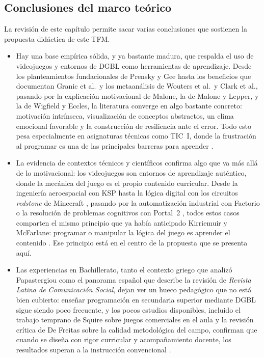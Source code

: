 \documentclass[a4paper,12pt]{article}
\begin{document}
\subsection{Conclusiones del marco teórico}

La revisión de este capítulo permite sacar varias conclusiones que sostienen la propuesta didáctica de este TFM.

\begin{itemize}
  \item Hay una base empírica sólida, y ya bastante madura, que respalda el uso de videojuegos y entornos de DGBL como herramientas de aprendizaje. Desde los planteamientos fundacionales de Prensky y Gee hasta los beneficios que documentan Granic et al.\ y los metaanálisis de Wouters et al.\ y Clark et al., pasando por la explicación motivacional de Malone, la de Malone y Lepper, y la de Wigfield y Eccles, la literatura converge en algo bastante concreto: motivación intrínseca, visualización de conceptos abstractos, un clima emocional favorable y la construcción de resiliencia ante el error. Todo esto pesa especialmente en asignaturas técnicas como TIC~I, donde la frustración al programar es una de las principales barreras para aprender \citep{prensky2001dgbl, gee2003games, granic2014benefits, wouters2013meta, clark2016digital, malone1981intrinsic, malone1987makinglearning, wigfield2000expectancy, papastergiou2009digital}.

  \item La evidencia de contextos técnicos y científicos confirma algo que va más allá de lo motivacional: los videojuegos son entornos de aprendizaje auténtico, donde la mecánica del juego es el propio contenido curricular. Desde la ingeniería aeroespacial con KSP \citep{ksp2023aiac} hasta la lógica digital con los circuitos \textit{redstone} de Minecraft \citep{lee2025minecraft}, pasando por la automatización industrial con Factorio \citep{factorio2025ieee} o la resolución de problemas cognitivos con Portal~2 \citep{shute2015portal, portal2intelligence2016, plass2015foundations}, todos estos casos comparten el mismo principio que ya había anticipado Kirriemuir y McFarlane: programar o manipular la lógica del juego es aprender el contenido \citep{kirriemuir2004literature}. Ese principio está en el centro de la propuesta que se presenta aquí.

  \item Las experiencias en Bachillerato, tanto el contexto griego que analizó Papastergiou como el panorama español que describe la revisión de \textit{Revista Latina de Comunicación Social}, dejan ver un hueco pedagógico que no está bien cubierto: enseñar programación en secundaria superior mediante DGBL sigue siendo poco frecuente, y los pocos estudios disponibles, incluido el trabajo temprano de Squire sobre juegos comerciales en el aula y la revisión crítica de De Freitas sobre la calidad metodológica del campo, confirman que cuando se diseña con rigor curricular y acompañamiento docente, los resultados superan a la instrucción convencional \citep{papastergiou2009digital, revistacomunicacion2022, squire2003video, defreitas2006serious, amsterdam2017dgbl}.


\end{itemize}
\end{document}
